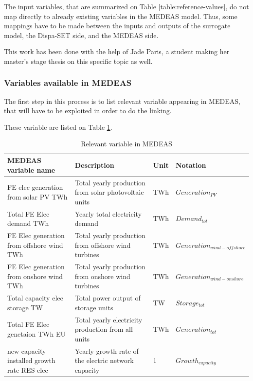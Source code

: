 The input variables, that are summarized on Table \ref{table:reference-values}, do not map directly to already existing variables in the MEDEAS model. Thus, some mappings have to be made between the inputs and outputs of the surrogate model, the Dispa-SET side, and the MEDEAS side.

This work has been done with the help of Jade Paris, a student making her master's stage thesis on this specific topic as well.

\subsubsection{Variables available in MEDEAS}

The first step in this process is to list relevant variable appearing in MEDEAS, that will have to be exploited in order to do the linking.

These variable are listed on Table \ref{tab:medeas-vars}.

\begin{table}[h]
    \centering
    \begin{tabular}{|p{5cm}|p{5cm}|p{1cm}|p{4cm}|} \hline 
    MEDEAS variable name &  Description & Unit & Notation \\ \hline
     FE elec generation from solar PV TWh & Total yearly production from solar photovoltaic units & TWh & $Generation_{PV}$\\ \hline 
     Total FE Elec demand TWh & Yearly total electricity demand & TWh & $Demand_{tot}$ \\ \hline 
     FE Elec generation from offshore wind TWh & Total yearly production from offshore wind turbines & TWh & $Generation_{wind-offshore}$ \\ \hline 
     FE Elec generation from onshore wind TWh & Total yearly production from onshore wind turbines & TWh & $Generation_{wind-onshore}$ \\ \hline 
     Total capacity elec storage TW & Total power output of storage units & TW & $Storage_{tot}$ \\ \hline 
     Total FE Elec genetaion TWh EU & Total yearly electricity production from all units & TWh & $Generation_{tot}$ \\ \hline 
     new capacity installed growth rate RES elec & Yearly growth rate of the electric network capacity & 1 & $Growth_{capacity}$ \\ \hline
    \end{tabular}
    \caption{Relevant variable in MEDEAS}
    \label{tab:medeas-vars}
\end{table}

